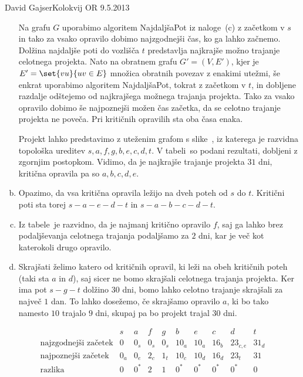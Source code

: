 \begin{naloga}{David Gajser}{Kolokvij OR 9.5.2013}
\begin{odgovor}
\begin{enumerate}[(a)]
Na grafu $G$ uporabimo algoritem {\sc NajdaljšaPot} iz naloge~\res[topo]{}(c)
z začetkom v $s$ in tako za vsako opravilo dobimo najzgodnejši čas,
ko ga lahko začnemo.
Dolžina najdaljše poti do vozlišča $t$
predstavlja najkrajše možno trajanje ce\-lot\-ne\-ga projekta.
Nato na obratnem grafu $G' = (V, E')$,
kjer je $E' = \set{vu}{uv \in E}$ množica obratnih povezav z enakimi utežmi,
še enkrat uporabimo algoritem {\sc NajdaljšaPot}, tokrat z začetkom v $t$,
in dobljene razdalje odštejemo od najkrajšega možnega trajanja projekta.
Tako za vsako opravilo dobimo še najpoznejši možen čas začetka,
da se celotno trajanje projekta ne poveča.
Pri kritičnih opravilih sta oba časa enaka.

Projekt lahko predstavimo z uteženim grafom s slike~\fig,
iz katerega je razvidna topološka ureditev $s, a, f, g, b, e, c, d, t$.
V tabeli~ so podani rezultati,
dobljeni z zgornjim postopkom.
Vidimo, da je najkrajše trajanje projekta $31$ dni,
kritična opravila pa so $a, b, c, d, e$.

\item Opazimo, da vsa kritična opravila ležijo na dveh poteh od $s$ do $t$.
Kritični poti sta torej $s - a - e - d - t$ in $s - a - b - c - d - t$.

\item Iz tabele~ je razvidno,
da je najmanj kritično opravilo $f$,
saj ga lahko brez podaljševanja celotnega trajanja podaljšamo za $2$ dni,
kar je več kot katerokoli drugo opravilo.

\item Skrajšati želimo katero od kritičnih opravil,
ki leži na obeh kritičnih poteh (taki sta $a$ in $d$),
saj sicer ne bomo skrajšali celotnega trajanja projekta.
Ker ima pot $s - g - t$ dolžino $30$ dni,
bomo lahko celotno trajanje skrajšali za največ $1$ dan.
To lahko dosežemo, če skrajšamo opravilo $a$,
ki bo tako namesto $10$ trajalo $9$ dni,
skupaj pa bo projekt trajal $30$ dni.
\end{enumerate}
%
\begin{slika}
\pgfslika
{}
\end{slika}
%
\begin{tabela}
$$
\begin{array}{r|ccccccccc}
& s & a & f & g & b & e & c & d & t \\ \hline
\text{najzgodnejši začetek} &
0 & 0_s & 0_s & 0_s & 10_a & 10_a & 16_b & 23_{c,e} & 31_d \\
\text{najpoznejši začetek} &
0_a & 0_e & 2_c & 1_t & 10_c & 10_d & 16_d & 23_t & 31 \\
\text{razlika} &
0 & 0^* & 2 & 1 & 0^* & 0^* & 0^* & 0^* & 0
\end{array}
$$
\end{tabela}
\end{odgovor}
\end{naloga}
